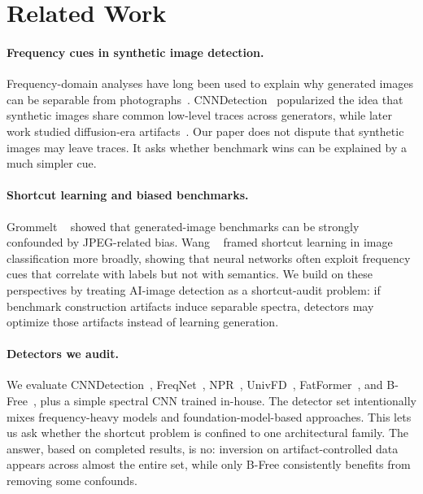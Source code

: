 \section{Related Work}
\label{sec:related}

\paragraph{Frequency cues in synthetic image detection.}
Frequency-domain analyses have long been used to explain why generated images can be separable from photographs~\cite{corvi2023intriguing,frank2020leveraging,durall2020watch}. CNNDetection~\cite{wang2020cnn} popularized the idea that synthetic images share common low-level traces across generators, while later work studied diffusion-era artifacts~\cite{ricker2024aeroblade,synthbuster2023}. Our paper does not dispute that synthetic images may leave traces. It asks whether benchmark wins can be explained by a much simpler cue.

\paragraph{Shortcut learning and biased benchmarks.}
Grommelt \etal~\cite{grommelt2024} showed that generated-image benchmarks can be strongly confounded by JPEG-related bias. Wang \etal~\cite{wang2023frequency} framed shortcut learning in image classification more broadly, showing that neural networks often exploit frequency cues that correlate with labels but not with semantics. We build on these perspectives by treating AI-image detection as a shortcut-audit problem: if benchmark construction artifacts induce separable spectra, detectors may optimize those artifacts instead of learning generation.

\paragraph{Detectors we audit.}
We evaluate CNNDetection~\cite{wang2020cnn}, FreqNet~\cite{freqnet}, NPR~\cite{npr}, UnivFD~\cite{univfd}, FatFormer~\cite{fatformer}, and B-Free~\cite{bfree}, plus a simple spectral CNN trained in-house. The detector set intentionally mixes frequency-heavy models and foundation-model-based approaches. This lets us ask whether the shortcut problem is confined to one architectural family. The answer, based on completed results, is no: inversion on artifact-controlled data appears across almost the entire set, while only B-Free consistently benefits from removing some confounds.
